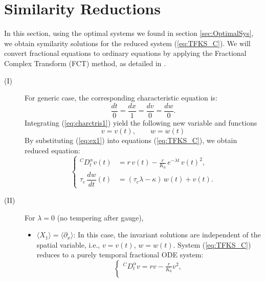\documentclass{article}
\begin{document}
\section{Similarity Reductions}\label{sec:SimilaritySolutions}
\par 
In this section, using the optimal systems we found in section \ref{sec:OptimalSys}, we obtain symilarity solutions for the reduced system (\ref{eq:TFKS_C}). We will convert fractional equations to ordinary equations by applying the Fractional Complex Transform (FCT) method, as detailed in \cite{Ibrahim2012,Li2010}.  
\begin{description}
\item[(I)] For generic case, the corresponding characteristic equation is:
\begin{equation}\label{eq:charctris1}
\dfrac{dt}{0}=\dfrac{dx}{1}=\dfrac{dv}{0}=\dfrac{dw}{0}.
\end{equation}
Integrating (\ref{eq:charctris1}) yield the following new variable and functions
\begin{equation}\label{eq:ex1}
v=v(t),\qquad w=w(t)
\end{equation}
By substituting (\ref{eq:ex1}) into equations (\ref{eq:TFKS_C}), we obtain reduced equation:
\begin{equation}\label{eq:reduce1}
\begin{cases}
{}^{C}D_t^{\alpha} v(t) &= r\,v(t) - \frac{r}{K_0}\,e^{-\lambda t}\,v(t)^2,\\
\tau_c\,\dfrac{dw}{dt}(t) &= (\tau_c\lambda-\kappa)\,w(t) + v(t).
\end{cases}
\end{equation}
\par 
\item[ (II)] For $\lambda=0$ (no tempering after gauge),
\par 
\begin{itemize}
\item[\textbf{II.A)}] $\langle X_1\rangle=\langle\partial_x\rangle$: 
In this case, the invariant solutions are independent of the spatial variable, i.e.,  $v=v(t)$, $w=w(t)$. System (\ref{eq:TFKS_C}) reduces to a purely temporal fractional ODE system:
\begin{equation}\label{eq:reduce2.2}
\begin{cases}
{}^{C}D_t^{\alpha} v = r v - \frac{r}{K_0} v^2,\\

\end{cases}
\end{equation}
\end{itemize}
\end{description}
\end{document}

